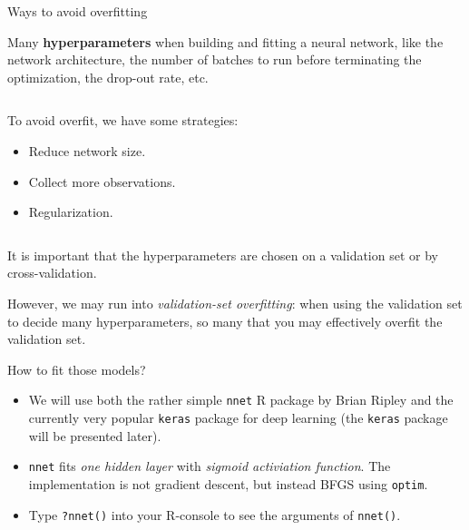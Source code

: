 \documentclass[
  10pt,
  ignorenonframetext,
]{beamer}
\providecommand{\tightlist}{%
  \setlength{\itemsep}{0pt}\setlength{\parskip}{0pt}}
\begin{document}
\begin{frame}
\begin{block}{Ways to avoid overfitting}
\protect\hypertarget{ways-to-avoid-overfitting}{}
\(~\)

Many \textbf{hyperparameters} when building and fitting a neural
network, like the network architecture, the number of batches to run
before terminating the optimization, the drop-out rate, etc.

\(~\)

To avoid overfit, we have some strategies:

\vspace{2mm}

\begin{itemize}
\item
  Reduce network size. \vspace{2mm}
\item
  Collect more observations. \vspace{2mm}
\item
  Regularization.
\end{itemize}

\(~\)

It is important that the hyperparameters are chosen on a validation set
or by cross-validation.

\vspace{2mm}

However, we may run into \emph{validation-set overfitting}: when using
the validation set to decide many hyperparameters, so many that you may
effectively overfit the validation set.
\end{block}
\end{frame}

\begin{frame}[fragile]
\begin{block}{How to fit those models?}
\protect\hypertarget{how-to-fit-those-models}{}
\(~\)

\begin{itemize}
\item
  We will use both the rather simple \texttt{nnet} R package by Brian
  Ripley and the currently very popular \texttt{keras} package for deep
  learning (the \texttt{keras} package will be presented later).
  \vspace{2mm}
\item
  \texttt{nnet} fits \emph{one hidden layer} with \emph{sigmoid
  activiation function}. The implementation is not gradient descent, but
  instead BFGS using \texttt{optim}. \vspace{2mm}
\end{itemize}

\begin{itemize}
\tightlist
\item
  Type \texttt{?nnet()} into your R-console to see the arguments of
  \texttt{nnet()}.
\end{itemize}

\vspace{2mm}
\end{block}
\end{frame}
\end{document}

